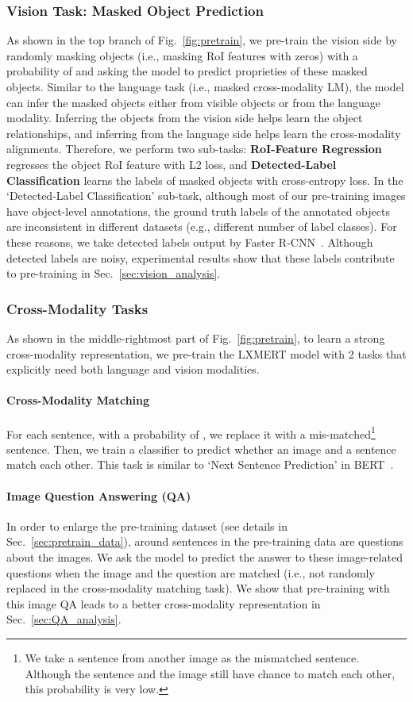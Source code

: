 \documentclass[11pt,a4paper]{article}
\begin{document}
\subsubsection{Vision Task: Masked Object Prediction}
\label{sec:vision_task}
As shown in the top branch of Fig.~\ref{fig:pretrain}, we pre-train the vision side by randomly masking objects (i.e., masking RoI features with zeros) with a probability of  and asking the model to predict proprieties of these masked objects.
Similar to the language task (i.e., masked cross-modality LM), the model can infer the masked objects either from visible objects or from the language modality. Inferring the objects from the vision side helps learn the object relationships, and inferring from the language side helps learn the cross-modality alignments.
Therefore, we perform two sub-tasks: \textbf{RoI-Feature Regression} regresses the object RoI feature  with L2 loss, and \textbf{Detected-Label Classification} learns the labels of masked objects with cross-entropy loss.
In the `Detected-Label Classification' sub-task, although most of our pre-training images have object-level annotations, 
the ground truth labels of the annotated objects are inconsistent in different datasets
(e.g., different number of label classes). 
For these reasons, we take detected labels output by Faster R-CNN~\cite{ren2015faster}.
Although detected labels are noisy, experimental results show that these labels contribute to pre-training in Sec.~\ref{sec:vision_analysis}.
\subsubsection{Cross-Modality Tasks}
\label{sec:x_task}
As shown in the middle-rightmost part of Fig.~\ref{fig:pretrain}, to learn a strong cross-modality representation, we pre-train the LXMERT model with 2 tasks that explicitly need both language and vision modalities.
\paragraph{Cross-Modality Matching} 
For each sentence, with a probability of , we replace it with a mis-matched\footnote{
We take a sentence from another image as the mismatched sentence. Although the sentence and the image still have chance to match each other, this probability is very low. 
}
sentence.
Then, we train a classifier to predict whether an image and a sentence match each other.
This task is similar to `Next Sentence Prediction' in BERT~\cite{devlin2018bert}.
\paragraph{Image Question Answering (QA)}
In order to enlarge the pre-training dataset (see details in Sec.~\ref{sec:pretrain_data}), around  sentences in the pre-training data are questions about the images.
We ask the model to predict the answer to these image-related questions 
when the image and the question are matched (i.e., not randomly replaced in the cross-modality matching task).
We show that pre-training with this image QA leads to a better cross-modality representation in Sec.~\ref{sec:QA_analysis}.
\end{document}
